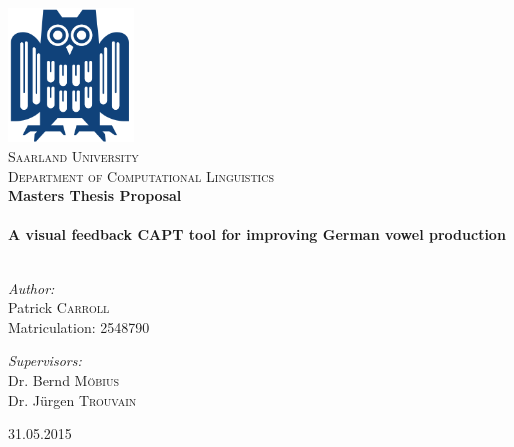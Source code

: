 \begin{titlepage}
\begin{center}

\includegraphics[width=0.25\textwidth]{./eule}~\\[1cm]

\textsc{\LARGE Saarland  University}\\[0.4cm]
\textsc{\Large Department of Computational Linguistics}\\[1.5cm]

 \textbf{\Large Masters Thesis Proposal}\\[0.5cm]

\HRule \\[1.0cm]

{ \huge \bfseries A visual feedback CAPT tool for improving German vowel production}\\[0.4cm]

\HRule \\[1.5cm]

\begin{minipage}{0.4\textwidth}
\begin{flushleft} \large
\emph{Author:}\\
Patrick \textsc{Carroll}\\
Matriculation: 2548790
\end{flushleft}
\end{minipage}
\begin{minipage}{0.4\textwidth}
\begin{flushright} \large
\emph{Supervisors:} \\
Dr. Bernd \textsc{M{\"o}bius}\\
Dr. J{\"u}rgen \textsc{Trouvain}\\
\end{flushright}
\end{minipage}

\vfill

{\large 31.05.2015}

\end{center}
\end{titlepage}
